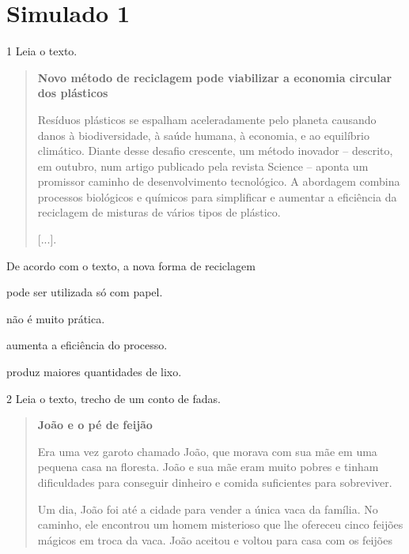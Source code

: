 \chapter{Simulado 1}

\num{1} Leia o texto.

\begin{quote}
\textbf{Novo método de reciclagem pode viabilizar a economia circular dos plásticos}

Resíduos plásticos se espalham aceleradamente pelo planeta causando
danos à biodiversidade, à saúde humana, à economia, e ao equilíbrio
climático. Diante desse desafio crescente, um método inovador --
descrito, em outubro, num artigo publicado pela revista Science --
aponta um promissor caminho de desenvolvimento tecnológico. A abordagem
combina processos biológicos e químicos para simplificar e aumentar a
eficiência da reciclagem de misturas de vários tipos de plástico.

{[}...{]}.

\end{quote}

De acordo com o texto, a nova forma de reciclagem

\begin{minipage}{.5\textwidth}
\begin{escolha}
\item pode ser utilizada só com papel.

\item não é muito prática.

\item aumenta a eficiência do processo.

\item produz maiores quantidades de lixo.
\end{escolha}
\end{minipage}

\num{2} Leia o texto, trecho de um conto de fadas.

\begin{quote}
\textbf{João e o pé de feijão}

Era uma vez garoto chamado João, que morava com sua mãe em uma pequena
casa na floresta. João e sua mãe eram muito pobres e tinham dificuldades
para conseguir dinheiro e comida suficientes para sobreviver.

Um dia, João foi até a cidade para vender a única vaca da família. No
caminho, ele encontrou um homem misterioso que lhe ofereceu cinco
feijões mágicos em troca da vaca. João aceitou e voltou para casa com os
feijões
\end{quote}

